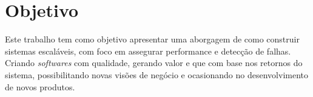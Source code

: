 \chapter{Objetivo}
Este trabalho tem como objetivo apresentar uma aborgagem de como construir
sistemas escaláveis, com foco em assegurar performance e detecção de falhas.
Criando \textit{softwares} com qualidade, gerando valor e que com base nos
retornos do sistema, possibilitando novas visões de negócio e ocasionando no
desenvolvimento de novos produtos.

